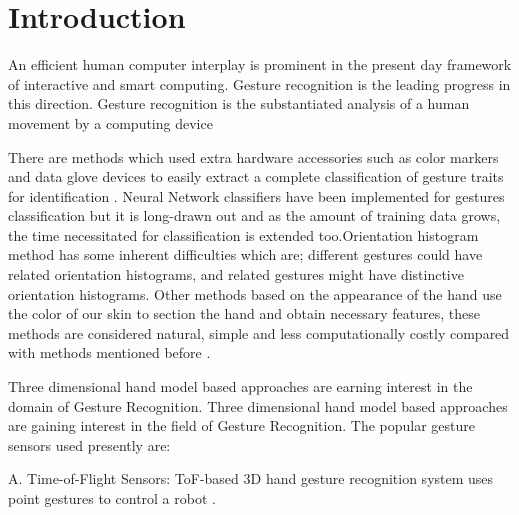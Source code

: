 \documentclass[conference]{IEEEtran}
\begin{document}




%
\IEEEpeerreviewmaketitle



\section{Introduction}
An efficient human computer interplay is prominent in the present day framework of interactive and smart computing. Gesture recognition is the leading progress in this direction.
Gesture recognition is the substantiated analysis of a human movement by a computing device

 There are methods which used extra hardware accessories such as color markers and data glove devices to easily extract a complete classification of gesture traits for identification \cite{1199054} . Neural Network classifiers have been implemented for gestures classification \cite{Murakami:1991:GRU:108844.108900} but it is long-drawn out and as the amount of training data grows, the time necessitated for classification is extended too.Orientation histogram method \cite{freeman1995orientation} has some inherent difficulties which are; different gestures could have related orientation histograms, and related gestures might have distinctive orientation histograms. Other methods based on the appearance of the hand use the color of our skin to section the hand and obtain necessary features, these methods are considered natural, simple and less computationally costly compared with methods mentioned before \cite{1199054} .

Three dimensional hand model based approaches \cite{cheng2016survey} are earning interest in the domain of Gesture Recognition.		Three dimensional hand model based approaches \cite{cheng2016survey} are gaining interest in the field of Gesture Recognition.
The popular gesture sensors used presently are:

A. Time-of-Flight Sensors:
ToF-based 3D hand gesture recognition system uses point gestures to control a robot \cite{droeschel2011learning}.
\end{document}
